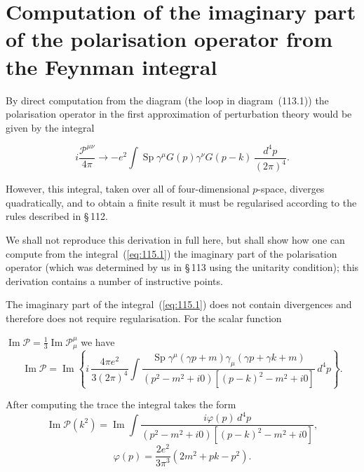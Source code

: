 
\section{Computation of the imaginary part of the polarisation operator from the Feynman integral}


By direct computation from the diagram (the loop in diagram~(113.1)) the polarisation operator in the first approximation of perturbation theory would be given by the integral

\begin{equation}
i\frac{\mathcal{P}^{\mu\nu}}{4\pi} \to -e^2 \int \operatorname{Sp} \gamma^\mu G(p) \gamma^\nu G(p - k)\,\frac{d^4p}{(2\pi)^4}.
\label{eq:115.1}
\end{equation}

However, this integral, taken over all of four-dimensional $p$-space, diverges quadratically, and to obtain a finite result it must be regularised according to the rules described in \S\,112.

We shall not reproduce this derivation in full here, but shall show how one can compute from the integral~(\ref{eq:115.1}) the imaginary part of the polarisation operator (which was determined by us in \S\,113 using the unitarity condition); this derivation contains a number of instructive points.

The imaginary part of the integral~(\ref{eq:115.1}) does not contain divergences and therefore does not require regularisation. For the scalar function


\noindent $\operatorname{Im} \mathcal{P} = \tfrac{1}{3}\operatorname{Im} \mathcal{P}_\mu^\mu$ we have
\[
\operatorname{Im} \mathcal{P} = \operatorname{Im}\left\{i\,\frac{4\pi e^2}{3(2\pi)^4} \int \frac{\operatorname{Sp}\gamma^\mu(\gamma p + m)\gamma_\mu(\gamma p + \gamma k + m)}{(p^2 - m^2 + i0)[(p - k)^2 - m^2 + i0]}\,d^4p\right\}.
\]

After computing the trace the integral takes the form
\begin{equation}
\operatorname{Im} \mathcal{P}(k^2) = \operatorname{Im} \int \frac{i\varphi(p)\,d^4p}{(p^2 - m^2 + i0)[(p - k)^2 - m^2 + i0]},
\label{eq:115.2}
\end{equation}
\[
\varphi(p) = \frac{2e^2}{3\pi^3}(2m^2 + pk - p^2).
\]

